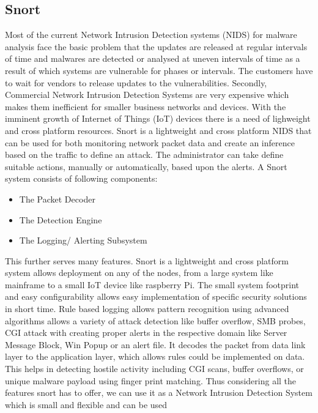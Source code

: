 \documentclass[11pt]{article}
\begin{document}
	\subsection{Snort}
	Most of the current Network Intrusion Detection systems (NIDS) for malware analysis face the basic problem that the updates are released at regular intervals of time and malwares are detected or analysed at uneven intervals of time as a result of which systems are vulnerable for phases or intervals. The customers have to wait for vendors to release updates to the vulnerabilities. Secondly, Commercial Network Intrusion Detection Systems are very expensive which makes them inefficient for smaller business networks and devices. With the imminent growth of Internet of Things (IoT) devices there is a need of lighweight and cross platform resources.
	Snort is a lightweight and cross platform NIDS that can be used for both monitoring network packet data and create an inference based on the traffic to define an attack. The administrator can take define suitable actions, manually or automatically, based upon the alerts.
	A Snort system consists of following components:
	\begin{itemize}
		\item The Packet Decoder
		\item The Detection Engine
		\item The Logging/ Alerting Subsystem
	\end{itemize}
	This further serves many features. Snort is a lightweight and cross platform system allows deployment on any of the nodes, from a large system like mainframe to a small IoT device like raspberry Pi. The small system footprint and easy configurability allows easy implementation of specific security solutions in short time. Rule based logging allows pattern recognition using advanced algorithms allows a variety of attack detection like buffer overflow, SMB probes, CGI attack with creating proper alerts in the respective domain like Server Message Block, Win Popup or an alert file. It decodes the packet from data link layer to the application layer, which allows rules could be implemented on data. This helps in detecting hostile activity including CGI scans, buffer overflows, or unique malware payload using finger print matching.
	Thus considering all the features snort has to offer, we can use it as a Network Intrusion Detection System which is small and flexible and can be used
	
\end{document}
